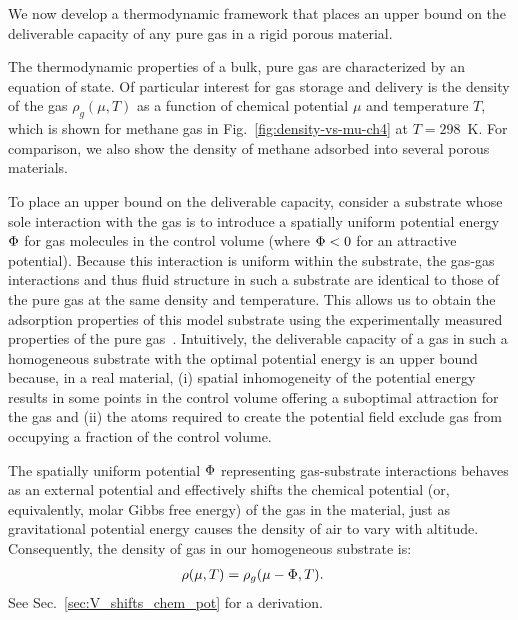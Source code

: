 We now develop a thermodynamic framework that places an upper bound on the deliverable capacity of any pure gas in a rigid porous material.

The thermodynamic properties of a bulk, pure gas are characterized by an
equation of state. Of particular interest for gas storage and delivery is the
density of the gas $\rho_g(\mu,T)$ as a function of chemical potential $\mu$
and temperature $T$, which is shown for methane gas in
Fig.~\ref{fig:density-vs-mu-ch4} at $T=298$\ K. For comparison, we also show
the density of methane adsorbed into several porous materials.

To place an upper bound on the deliverable capacity, consider a substrate whose
sole interaction with the gas is to introduce a spatially uniform potential
energy $\Phi$ for gas molecules in the control volume (where $\Phi<0$ for an
attractive potential). Because this interaction is uniform within the
substrate, the gas-gas interactions and thus fluid structure in such a
substrate are identical to those of the pure gas at the same density and
temperature. This allows us to obtain the adsorption properties of this model
substrate using the experimentally measured properties of the pure
gas~\cite{nist}. Intuitively, the deliverable capacity of a gas in such a
homogeneous substrate with the optimal potential energy is an upper bound
because, in a real material, (i) spatial inhomogeneity of the potential
energy results in some points in the control volume offering a suboptimal
attraction for the gas and (ii) the atoms required to create the potential
field exclude gas from occupying a fraction of the control volume.

The spatially uniform potential $\Phi$ representing gas-substrate interactions
behaves as an external potential and effectively shifts the chemical potential
(or, equivalently, molar Gibbs free energy) of the gas in the material, just as
gravitational potential energy causes the density of air to vary with altitude.
Consequently, the density of gas in our homogeneous substrate is:
\begin{align}
    \rho(\mu,T) &= \rho_g(\mu - \Phi,T). \label{eq:mof-density}
\end{align}
See Sec.~\ref{sec:V_shifts_chem_pot} for a derivation.

